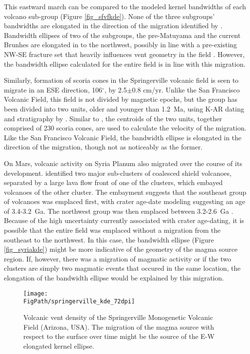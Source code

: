 This eastward march can be compared to the modeled kernel bandwidths of each volcano sub-group (Figure \ref{fig_sfvfkde}). None of the three subgroups' bandwidths are elongated in the direction of the migration identified by \citet{tanaka1986migration}. Bandwidth ellipses of two of the subgroups, the pre-Matuyama and the current Brunhes are elongated in to the northwest, possibly in line with a pre-existing NW-SE fracture set that heavily influences vent geometry  in the field \citep{marshall2015subsurface}. However, the bandwidth ellipse calculated for the entire field is in line with this migration.

Similarly, formation of scoria cones in the Springerville volcanic field is seen to migrate in an ESE direction, 106$^{\circ}$, by 2.5$\pm$0.8 cm/yr. Unlike the San Francisco Volcanic Field, this field is not divided by magnetic epochs, but the group has been divided into two units, older and younger than 1.2~Ma, using K-AR dating and stratigraphy by \citet{condit1989patterns}. Similar to \citet{tanaka1986migration}, the centroids of the two units, together comprised of 230 scoria cones, are used to calculate the velocity of the migration. Like the San Francisco Volcanic Field, the bandwidth ellipse is elongated in the direction of the migration, though not as noticeably as the former.

On Mars, volcanic activity on Syria Planum also migrated over the course of its development. \citet{richardson2013volcanic} identified two major sub-clusters of coalesced shield volcanoes, separated by a large lava flow front of one of the clusters, which embayed volcanoes of the other cluster. The embayment suggests that the southeast group of volcanoes was emplaced first, with crater age-date modeling suggesting an age of 3.4-3.2~Ga. The northwest group was then emplaced between 3.2-2.6~Ga \citep{richardson2013volcanic}. Because of the high uncertainty currently associated with crater age-dating, it is possible that the entire field was emplaced without a migration from the southeast to the northwest. In this case, the bandwidth ellipse (Figure \ref{fig_syriakde}) might be more indicative of the geometry of the magma source region. If, however, there was a migration of magmatic activity or if the two clusters are simply two magmatic events that occured in the same location, the elongation of the bandwidth ellipse would be explained by this migration.

\begin{figure}
\centering
\texttt{[image: \\FigPath/springerville\_kde\_72dpi]}
\caption[Volcanic vent density of the Springerville Monogenetic Volcanic Field (Arizona, USA)]{Volcanic vent density of the Springerville Monogenetic Volcanic Field (Arizona, USA). The migration of the magma source with respect to the surface over time might be the source of the E-W elongated kernel ellipse.}
\label{fig_springervillekde}
\end{figure}

